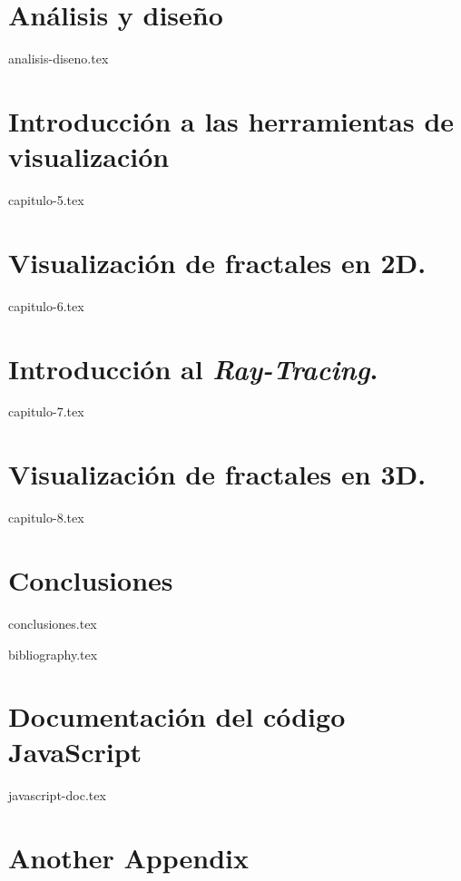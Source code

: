 \documentclass[11pt]{report}
\begin{document}
\chapter*{Análisis y diseño}
\label{chap:analisis-diseno}

{analisis-diseno.tex}

\chapter{Introducción a las herramientas de visualización}
\label{chap:visualizacion}

{capitulo-5.tex}

\chapter{Visualización de fractales en 2D.}
\label{chap:fractales-2D}

{capitulo-6.tex}

\chapter{Introducción al \textit{Ray-Tracing}.}
\label{chap:ray-tracing}

{capitulo-7.tex}

\chapter{Visualización de fractales en 3D.}
\label{chap:fractales-3D}

{capitulo-8.tex}

\chapter*{Conclusiones}
\label{chap:conclusiones}

{conclusiones.tex}


{bibliography.tex}



\appendix
\cleardoublepage


\chapter{Documentación del código JavaScript}
\label{appendix:javascript}

{javascript-doc.tex}


\chapter{Another Appendix}
\end{document}
